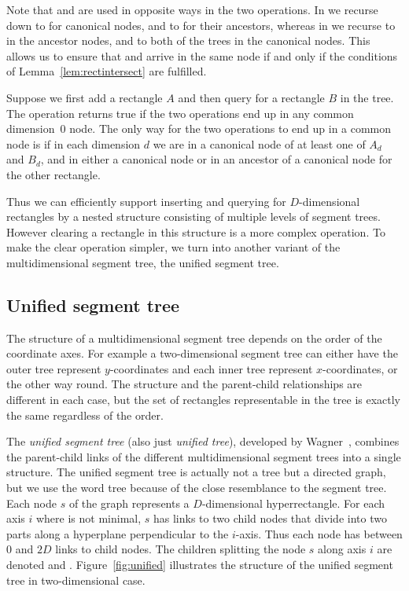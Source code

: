 \documentclass[english,gradu]{tktltiki2018}
\begin{document}
Note that \subtree{} and \subtreep{} are used in opposite ways in the two operations.
In \adddt{} we recurse down to \subtree{} for canonical nodes, and to \subtreep{} for their ancestors, whereas in \checkdt{} we recurse to \subtree{} in the ancestor nodes, and to both of the trees in the canonical nodes.
This allows us to ensure that \adddt{} and \checkdt{} arrive in the same node if and only if the conditions of Lemma~\ref{lem:rectintersect} are fulfilled.

Suppose we first add a rectangle $A$ and then query for a rectangle $B$ in the tree.
The \checkdt operation returns true if the two operations end up in any common dimension~0 node.
The only way for the two operations to end up in a common node is if in each dimension $d$ we are in a canonical node of at least one of $A_d$ and $B_d$, and in either a canonical node or in an ancestor of a canonical node for the other rectangle.

Thus we can efficiently support inserting and querying for $D$-dimensional rectangles by a nested structure consisting of multiple levels of segment trees.
However clearing a rectangle in this structure is a more complex operation.
To make the clear operation simpler, we turn into another variant of the multidimensional segment tree, the unified segment tree.

\subsection{Unified segment tree}\label{sec:unifiedtree}

The structure of a multidimensional segment tree depends on the order of the coordinate axes.
For example a two-dimensional segment tree can either have the outer tree represent $y$-coordinates and each inner tree represent $x$-coordinates, or the other way round.
The structure and the parent-child relationships are different in each case, but the set of rectangles representable in the tree is exactly the same regardless of the order.

The \emph{unified segment tree} (also just \emph{unified tree}), developed by Wagner~\cite{unified}, combines the parent-child links of the different multidimensional segment trees into a single structure.
The unified segment tree is actually not a tree but a directed graph, but we use the word tree because of the close resemblance to the segment tree.
Each node $s$ of the graph represents a $D$-dimensional hyperrectangle.
For each axis $i$ where  is not minimal, $s$ has links to two child nodes that divide  into two parts along a hyperplane perpendicular to the $i$-axis.
Thus each node has between 0 and $2D$ links to child nodes.
The children splitting the node $s$ along axis $i$ are denoted  and .
Figure~\ref{fig:unified} illustrates the structure of the unified segment tree in two-dimensional case.
\end{document}
